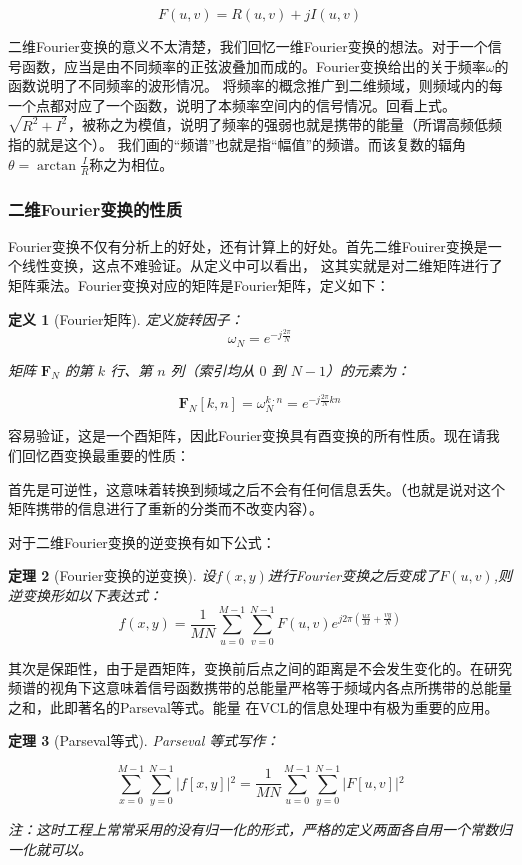 \documentclass{ctexart}
\theoremstyle{cnthm}
\newtheorem{theorem}{定理}[section]
\newtheorem{definition}[theorem]{定义}
\begin{document}
\[
F(u,v) = R(u,v) + j I(u,v)
\]

二维Fourier变换的意义不太清楚，我们回忆一维Fourier变换的想法。对于一个信号函数，应当是由不同频率的正弦波叠加而成的。Fourier变换给出的关于频率$\omega$的函数说明了不同频率的波形情况。
将频率的概念推广到二维频域，则频域内的每一个点都对应了一个函数，说明了本频率空间内的信号情况。回看上式。$\sqrt{R^2 + I^2}$，被称之为模值，说明了频率的强弱也就是携带的能量（所谓高频低频指的就是这个）。
我们画的“频谱”也就是指“幅值”的频谱。而该复数的辐角$\theta = \arctan\frac{I}{R}$称之为相位。

\subsubsection{二维Fourier变换的性质}

Fourier变换不仅有分析上的好处，还有计算上的好处。首先二维Fouirer变换是一个线性变换，这点不难验证。从定义中可以看出，
这其实就是对二维矩阵进行了矩阵乘法。Fourier变换对应的矩阵是Fourier矩阵，定义如下：

\begin{definition}[Fourier矩阵]
    定义旋转因子：$$\omega_N = e^{-j\frac{2\pi}{N}}$$

    矩阵 $\mathbf{F}_N$ 的第 $k$ 行、第 $n$ 列（索引均从 $0$ 到 $N-1$）的元素为：
    
    $$\mathbf{F}_N[k, n] = \omega_N^{k \cdot n} = e^{-j\frac{2\pi}{N} kn}$$
\end{definition}

容易验证，这是一个酉矩阵，因此Fourier变换具有酉变换的所有性质。现在请我们回忆酉变换最重要的性质：

首先是可逆性，这意味着转换到频域之后不会有任何信息丢失。（也就是说对这个矩阵携带的信息进行了重新的分类而不改变内容）。

对于二维Fourier变换的逆变换有如下公式：

\begin{theorem}[Fourier变换的逆变换]
    设$f(x,y)$进行Fourier变换之后变成了$F(u,v)$,则逆变换形如以下表达式：
    \[
    f(x, y) = \frac{1}{MN} \sum_{u=0}^{M-1} \sum_{v=0}^{N-1} F(u,v) e^{j2\pi\left(\frac{ux}{M}+ \frac{vy}{N}\right)}
    \]
\end{theorem}

其次是保距性，由于是酉矩阵，变换前后点之间的距离是不会发生变化的。在研究频谱的视角下这意味着信号函数携带的总能量严格等于频域内各点所携带的总能量之和，此即著名的Parseval等式。能量
在VCL的信息处理中有极为重要的应用。

\begin{theorem}[Parseval等式]
    Parseval 等式写作：
    
    $$\sum_{x=0}^{M-1} \sum_{y=0}^{N-1} \vert{}f[x, y]\vert{}^2 = \frac{1}{MN} \sum_{u=0}^{M-1} \sum_{y=0}^{N-1} \vert{}F[u, v]\vert{}^2$$

    注：这时工程上常常采用的没有归一化的形式，严格的定义两面各自用一个常数归一化就可以。
\end{theorem}
\end{document}

